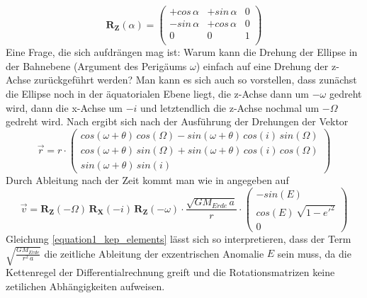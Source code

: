 \begin{equation}
\mathbf{R_Z}(\alpha) = 
	\left(
		\begin{array}{ccc}
			+cos\,\alpha & +sin\,\alpha & 0\\
			-sin\,\alpha & +cos\,\alpha & 0\\
			0 & 0 & 1 \\
		\end{array}
	\right)
\end{equation}
Eine Frage, die sich aufdrängen mag ist: Warum kann die Drehung der Ellipse in der Bahnebene (Argument des Perigäums \ensuremath{\omega}) einfach auf eine Drehung der z-Achse zurückgeführt werden? Man kann es sich auch so vorstellen, dass zunächst die Ellipse noch in der äquatorialen Ebene liegt, die z-Achse dann um \ensuremath{-\omega} gedreht wird, dann die x-Achse um \ensuremath{-i} und letztendlich die z-Achse nochmal um \ensuremath{-\Omega} gedreht wird.
\newpar
Nach \cite{HandRaum} ergibt sich nach der Ausführung der Drehungen der Vektor
\begin{equation}
\vec{r} = r\cdot  
	\left(
		\begin{array}{c}
				cos(\omega+\theta)\,cos(\Omega)-sin(\omega+\theta)\,cos(i)\,sin(\Omega)\\
				cos(\omega+\theta)\,sin(\Omega)+sin(\omega+\theta)\,cos(i)\,cos(\Omega)\\
				sin(\omega+\theta)\,sin(i)				
		\end{array}
	\right)
	\label{equation1_kep_elements}
\end{equation}
Durch Ableitung nach der Zeit kommt man wie in \cite{HandRaum} angegeben auf
\begin{equation}
	\vec{v}=\mathbf{R_Z}(-\Omega)\,\mathbf{R_X}(-i)\,\mathbf{R_Z}(-\omega)\cdot\frac{\sqrt{GM_{Erde}\,a}}{r}\cdot\left(\begin{array}{c}-sin(E)\\ cos(E)\,\sqrt{1-e'^2} \\0\end{array}\right) 
	\label{equation2_kep_elements}
\end{equation} 
Gleichung \ref{equation1_kep_elements} lässt sich so interpretieren, dass der Term \ensuremath{\sqrt{\frac{GM_{Erde}}{r^2\,a}}} die zeitliche Ableitung der exzentrischen Anomalie \ensuremath{E} sein muss, da die Kettenregel der Differentialrechnung greift und die Rotationsmatrizen keine zetilichen Abhängigkeiten aufweisen.
\newpar
